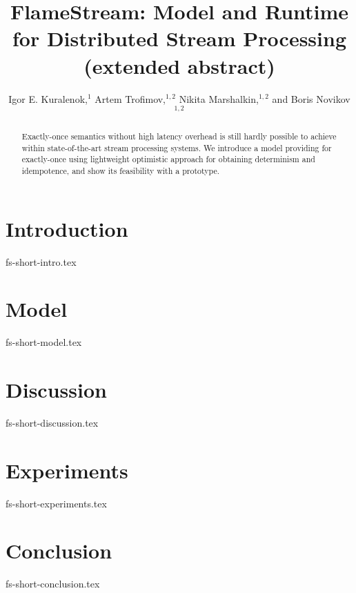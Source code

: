\documentclass[sigconf]{acmart}
\theoremstyle{remark}
\newcommand {\FlameStream} {FlameStream}
\begin{document}

\title {\FlameStream: Model and Runtime for Distributed Stream Processing (extended abstract)}

\author{  Igor E. Kuralenok,$^1$     Artem Trofimov,$^ {1,2}$    Nikita Marshalkin,$^ {1,2}$   and  Boris Novikov$^ {1,2}$ }

\begin{abstract}
Exactly-once semantics without high latency overhead is still hardly  possible to achieve within state-of-the-art stream processing systems. We introduce  a model   providing  for exactly-once using lightweight optimistic approach for obtaining determinism and idempotence, and show its feasibility with a prototype.
\end {abstract}

\maketitle

\section {Introduction}
 {fs-short-intro.tex}

\section {Model}
 {fs-short-model.tex}

\section {Discussion}
 {fs-short-discussion.tex}

\section {Experiments}
 {fs-short-experiments.tex}

\section {Conclusion}
 {fs-short-conclusion.tex}



\end{document}

